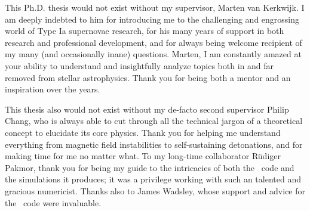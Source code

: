 \documentclass{ut-thesis}
\begin{document}
\begin{preliminary}

\cleardoublepage


\begin{acknowledgements}


This Ph.D. thesis would not exist without my supervisor, Marten van Kerkwijk.  I am deeply indebted to him for introducing me to the challenging and engrossing world of Type Ia supernovae research, for his many years of support in both research and professional development, and for always being welcome recipient of my many (and occasionally inane) questions.  Marten, I am constantly amazed at your ability to understand and insightfully analyze topics both in and far removed from stellar astrophysics.  Thank you for being both a mentor and an inspiration over the years.

This thesis also would not exist without my de-facto second supervisor Philip Chang, who is always able to cut through all the technical jargon of a theoretical concept to elucidate its core physics.  Thank you for helping me understand everything from magnetic field instabilities to self-sustaining detonations, and for making time for me no matter what.  To my long-time collaborator R\"{u}diger Pakmor, thank you for being my guide to the intricacies of both the \arepo\ code and the simulations it produces; it was a privilege working with such an talented and gracious numericist.  Thanks also to James Wadsley, whose support and advice for the \gasoline\ code were invaluable.


\end{acknowledgements}
\end{preliminary}
\end{document}
